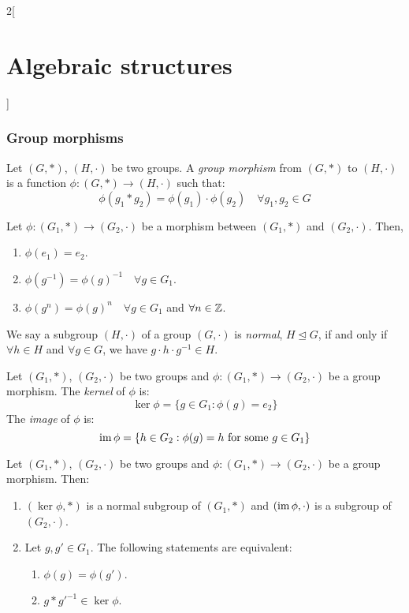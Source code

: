 \documentclass[../../../main_math.tex]{subfiles}
\begin{document}
\begin{multicols}{2}[\section{Algebraic structures}]
  \subsubsection{Group morphisms}
  \begin{definition}\label{AS:groupmorphism}
    Let $(G,*)$, $(H,\cdot)$ be two groups. A \emph{group morphism} from $(G,*)$ to $(H,\cdot)$ is a function $\phi:(G,*)\rightarrow (H,\cdot)$ such that: $$\phi(g_1*g_2)=\phi(g_1)\cdot\phi(g_2)\quad\forall g_1,g_2\in G$$
  \end{definition}
  \begin{lemma}
    Let $\phi:(G_1,*)\rightarrow (G_2,\cdot)$ be a morphism between $(G_1,*)$ and $(G_2,\cdot)$. Then,
    \begin{enumerate}
      \item $\phi(e_1)=e_2$.
      \item $\phi(g^{-1})=\phi(g)^{-1}\quad\forall g\in G_1$.
      \item $\phi(g^n)=\phi(g)^n\quad\forall g\in G_1$ and $\forall n\in\mathbb{Z} $.
    \end{enumerate}
  \end{lemma}
  \begin{definition}
    We say a subgroup $(H,\cdot)$ of a group $(G,\cdot)$ is \emph{normal}, $H\unlhd G$, if and only if $\forall h\in H$ and $\forall g\in G$, we have $g\cdot h\cdot g^{-1}\in H$.
  \end{definition}
  \begin{definition}
    Let $(G_1,*)$, $(G_2,\cdot)$ be two groups and $\phi:(G_1,*)\rightarrow (G_2,\cdot)$ be a group morphism. The \emph{kernel} of $\phi$ is: $$\ker\phi=\{g\in G_1:\phi(g)=e_2\}$$
    The \emph{image} of $\phi$ is: $$\operatorname{im}\phi=\{h\in G_2:\phi(g)=h\text{ for some }g\in G_1\}$$
  \end{definition}
  \begin{proposition}
    Let $(G_1,*)$, $(G_2,\cdot)$ be two groups and $\phi:(G_1,*)\rightarrow (G_2,\cdot)$ be a group morphism. Then:
    \begin{enumerate}
      \item $(\ker\phi,*)$ is a normal subgroup of $(G_1,*)$ and $(\operatorname{im}\phi,\cdot)$ is a subgroup of $(G_2,\cdot)$.
      \item Let $g,g'\in G_1$. The following statements are equivalent:
            \begin{enumerate}
              \item $\phi(g)=\phi(g')$.
              \item $g*g'^{-1}\in\ker\phi$.

\end{enumerate}
\end{enumerate}
\end{proposition}
\end{multicols}
\end{document}
